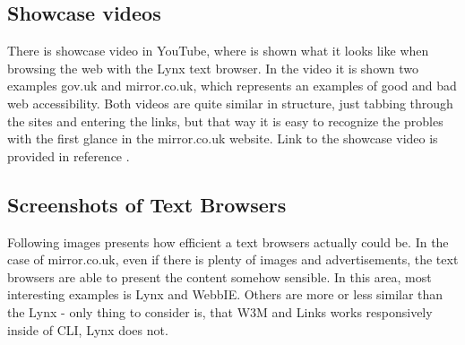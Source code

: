 \subsection{Showcase videos}
\label{tb-showcase}
There is showcase video in YouTube, where is shown what it looks like when browsing the web with the Lynx text browser. In the video it is shown two examples gov.uk and mirror.co.uk, which represents an examples of good and bad web accessibility. Both videos are quite similar in structure, just tabbing through the sites and entering the links, but that way it is easy to recognize the probles with the first glance in the mirror.co.uk website. Link to the showcase video is provided in reference \textcite{tb-showcase}.
\subsection{Screenshots of Text Browsers}
\label{tb-screenshots}
Following images presents how efficient a text browsers actually could be. In the case of mirror.co.uk, even if there is plenty of images and advertisements, the text browsers are able to present the content somehow sensible. In this area, most interesting examples is Lynx and WebbIE. Others are more or less similar than the Lynx - only thing to consider is, that W3M and Links works responsively inside of CLI, Lynx does not. 

